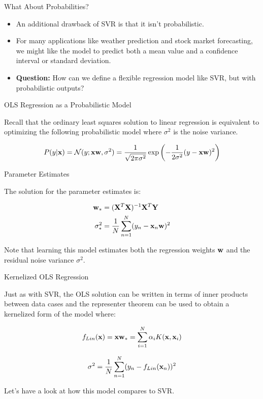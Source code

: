 \documentclass[serif,xcolor=pdftex,dvipsnames,table,hyperref={bookmarks=false,breaklinks}]{beamer}
\begin{document}
\begin{frame}[t]{What About Probabilities?}

\begin{itemize}
\item An additional drawback of SVR is that it isn't probabilistic.

\pause\item For many applications like weather prediction and stock 
market forecasting, we might like the model to predict both a 
mean value and a confidence interval or standard deviation.

\pause\item \textbf{Question:} How can we define a flexible regression model 
like SVR, but with probabilistic outputs?
\end{itemize}

\end{frame}

\begin{frame}[t]{OLS Regression as a Probabilistic Model}

Recall that the ordinary least squares solution to linear regression
is equivalent to optimizing the following probabilistic model
where $\sigma^2$ is the noise variance.

\pause
\begin{align*}
P(y|{\mathbf{x}}) = \mathcal{N}(y;{\mathbf{x}}{\mathbf{w}}, \sigma^2)
             = 
\frac{1}{\sqrt{2\pi\sigma^2}}\exp\left(-\frac{1}{2\sigma^2}(y-{\mathbf{x}}{\mathbf{w}}
)^2\right)
\end{align*}

\end{frame}

\begin{frame}[t]{Parameter Estimates}

The solution for the parameter estimates is:

\begin{align}
{\mathbf{w}}_* & = ({\mathbf{X}}^T{\mathbf{X}})^{-1}{\mathbf{X}}^T{\mathbf{Y}}\\
\sigma^2_*  & = \frac{1}{N}\sum_{n=1}^N (y_n - {\mathbf{x}}_n{\mathbf{w}})^2
\end{align}

\pause Note that learning this model estimates both the regression
weights ${\mathbf{w}}$ and the residual noise variance $\sigma^2$.

\end{frame}

\begin{frame}[t]{Kernelized OLS Regression}

Just as with SVR, the OLS solution can be written in terms of inner products 
between data cases and the representer theorem can be used to obtain a 
kernelized form of the model where:

\pause
$$f_{Lin}({\mathbf{x}}) = {\mathbf{x}}{\mathbf{w}}_* = \sum_{i=1}^N 
\alpha_iK({\mathbf{x}},{\mathbf{x}}_i)$$

\pause
$$\sigma^2  = \frac{1}{N}\sum_{n=1}^N (y_n - f_{Lin}({\mathbf{x}}_n))^2$$

\pause Let's have a look at how this model compares to SVR.

\end{frame}
\end{document}
